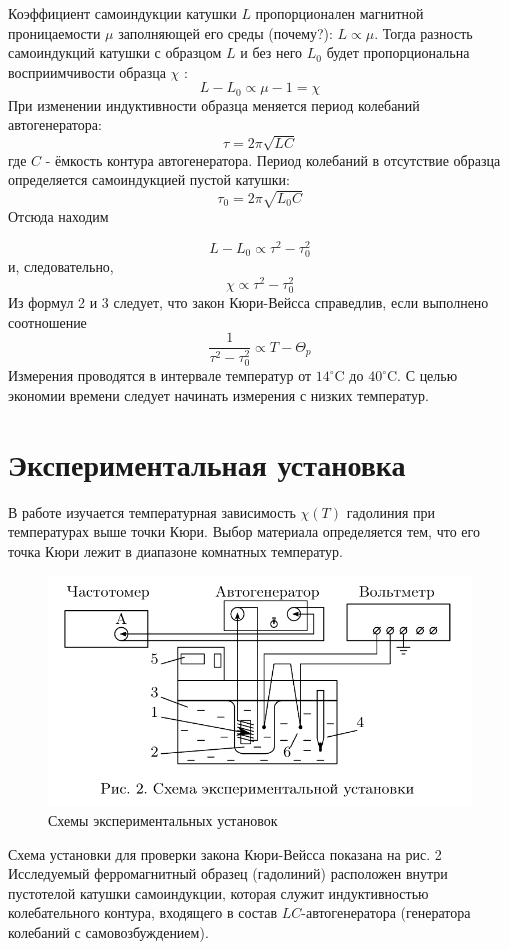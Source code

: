\documentclass[a4paper, 12pt]{article}%
\begin{document}
Коэффициент самоиндукции катушки $L$ пропорционален магнитной проницаемости $\mu$ заполняющей его среды (почему?): $L \propto \mu$. Тогда разность самоиндукций катушки с образцом $L$ и без него $L_{0}$ будет пропорциональна восприимчивости образца $\chi$ :
$$
L-L_{0} \propto \mu-1=\chi
$$
При изменении индуктивности образца меняется период колебаний автогенератора:
$$
\tau=2 \pi \sqrt{L C}
$$
где $C$ - ёмкость контура автогенератора. Период колебаний в отсутствие образца определяется самоиндукцией пустой катушки:
$$
\tau_{0}=2 \pi \sqrt{L_{0} C}
$$
Отсюда находим

$$
L-L_{0} \propto \tau^{2}-\tau_{0}^{2}
$$
и, следовательно,
$$
\chi \propto \tau^{2}-\tau_{0}^{2}
$$
Из формул 2 и 3 следует, что закон Кюри-Вейсса справедлив, если выполнено соотношение
$$
\frac{1}{\tau^{2}-\tau_{0}^{2}} \propto T-\Theta_{p}
$$
Измерения проводятся в интервале температур от $14^{\circ} \mathrm{C}$ до $40^{\circ} \mathrm{C}$. С целью экономии времени следует начинать измерения с низких температур.



\section{Экспериментальная установка}

В работе изучается температурная зависимость $\chi(T)$ гадолиния при температурах выше точки Кюри. Выбор материала определяется тем, что его точка Кюри лежит в диапазоне комнатных температур.

\begin{figure}[h!]
    \centering
	\includegraphics[width = \textwidth]{1.png}
    \caption{Схемы экспериментальных установок}
    \label{scheme}
\end{figure}

Схема установки для проверки закона Кюри-Вейсса показана на рис. 2 Исследуемый ферромагнитный образец (гадолиний) расположен внутри пустотелой катушки самоиндукции, которая служит индуктивностью колебательного контура, входящего в состав $L C$-автогенератора (генератора колебаний с самовозбуждением).
\end{document}
